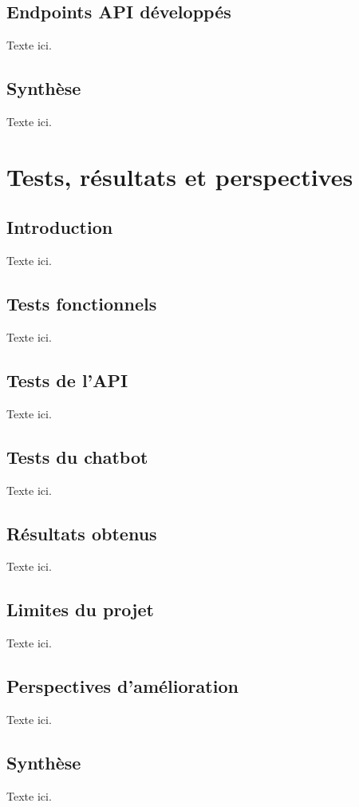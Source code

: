 \documentclass[12pt, a4paper, twoside]{report}
\begin{document}
\section{Endpoints API développés}
Texte ici.

\section{Synthèse}
Texte ici.

\chapter{Tests, résultats et perspectives}

\section{Introduction}
Texte ici.

\section{Tests fonctionnels}
Texte ici.

\section{Tests de l'API}
Texte ici.

\section{Tests du chatbot}
Texte ici.

\section{Résultats obtenus}
Texte ici.

\section{Limites du projet}
Texte ici.

\section{Perspectives d'amélioration}
Texte ici.

\section{Synthèse}
Texte ici.
\end{document}
